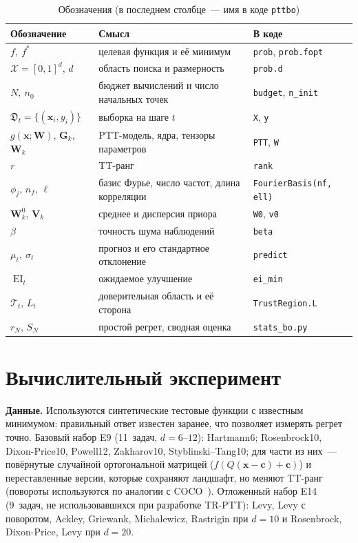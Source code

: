 \documentclass[11pt,a4paper]{article}
\newcommand{\X}{\mathcal X}
\newcommand{\x}{\mathbf x}
\newcommand{\W}{\mathbf W}
\newcommand{\G}{\mathbf G}
\newcommand{\EI}{\operatorname{EI}}
\begin{document}
\begin{table}[t]
\centering\small
\caption{Обозначения (в последнем столбце~--- имя в коде \texttt{pttbo})}\label{tab:notation}
\begin{tabular}{lll}
\toprule
Обозначение & Смысл & В коде \\
\midrule
$f,\ f^*$ & целевая функция и её минимум & \texttt{prob}, \texttt{prob.fopt} \\
$\X=[0,1]^d$, $d$ & область поиска и размерность & \texttt{prob.d} \\
$N,\ n_0$ & бюджет вычислений и число начальных точек & \texttt{budget}, \texttt{n\_init} \\
$\mathfrak D_t=\{(\x_i,y_i)\}$ & выборка на шаге $t$ & \texttt{X}, \texttt{y} \\
$g(\x;\W)$, $\G_k$, $\W_k$ & PTT-модель, ядра, тензоры параметров & \texttt{PTT}, \texttt{W} \\
$r$ & TT-ранг & \texttt{rank} \\
$\phi_j$, $n_f$, $\ell$ & базис Фурье, число частот, длина корреляции & \texttt{FourierBasis(nf, ell)} \\
$\W_k^0$, $\mathbf V_k$ & среднее и дисперсия приора & \texttt{W0}, \texttt{v0} \\
$\beta$ & точность шума наблюдений & \texttt{beta} \\
$\mu_t,\ \sigma_t$ & прогноз и его стандартное отклонение & \texttt{predict} \\
$\EI_t$ & ожидаемое улучшение & \texttt{ei\_min} \\
$\mathcal T_t$, $L_t$ & доверительная область и её сторона & \texttt{TrustRegion.L} \\
$r_N$, $S_N$ & простой регрет, сводная оценка & \texttt{stats\_bo.py} \\
\bottomrule
\end{tabular}
\end{table}

\section{Вычислительный эксперимент}

\textbf{Данные.} Используются синтетические тестовые функции с известным минимумом: правильный ответ
известен заранее, что позволяет измерять регрет точно. Базовый набор E9 (11~задач, $d=6$--$12$):
Hartmann6; Rosenbrock10, Dixon-Price10, Powell12, Zakharov10, Styblinski--Tang10; для части из них~---
повёрнутые случайной ортогональной матрицей ($f(Q(\x-\mathbf c)+\mathbf c)$) и переставленные версии,
которые сохраняют ландшафт, но меняют TT-ранг (повороты используются по аналогии с
COCO~\cite{hansen2021coco}). Отложенный набор E14 (9~задач, не использовавшихся при разработке TR-PTT):
Levy, Levy с поворотом, Ackley, Griewank, Michalewicz, Rastrigin при $d=10$ и Rosenbrock, Dixon-Price, Levy
при $d=20$.
\end{document}
